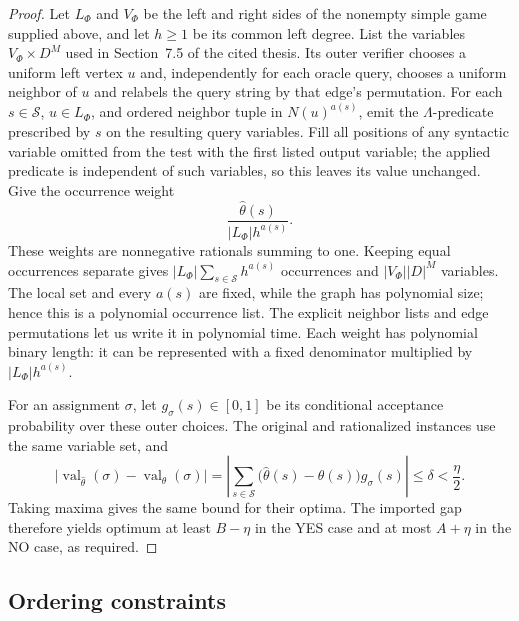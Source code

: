 \begin{proof}
Let \(L_\Phi\) and \(V_\Phi\) be the left and right sides of the
nonempty simple game supplied above, and let \(h\ge1\) be its common
left degree.
List the variables \(V_\Phi\times D^M\) used in Section~7.5 of the
cited thesis. Its outer verifier chooses a uniform left vertex \(u\)
and, independently for each
oracle query, chooses a uniform neighbor of \(u\) and relabels the
query string by that edge's permutation. For each \(s\in\mathcal S\),
\(u\in L_\Phi\), and ordered neighbor tuple in \(N(u)^{a(s)}\), emit
the \(\Lambda\)-predicate prescribed by \(s\) on the resulting query
variables. Fill all positions of any syntactic variable omitted from
the test with the first listed output variable; the applied predicate
is independent of such variables, so this leaves its value unchanged.
Give the occurrence
weight
\[
 \frac{\widehat\theta(s)}{|L_\Phi|h^{a(s)}}.
\]
These weights are nonnegative rationals summing to one. Keeping equal
occurrences separate gives
\(|L_\Phi|\sum_{s\in\mathcal S}h^{a(s)}\) occurrences and
\(|V_\Phi||D|^M\) variables. The local set and every \(a(s)\) are
fixed, while the graph has polynomial size; hence this is a polynomial
occurrence list. The explicit neighbor lists and edge permutations let
us write it in polynomial time. Each weight has polynomial binary
length: it can be represented with a fixed denominator multiplied by
\(|L_\Phi|h^{a(s)}\).

For an assignment \(\sigma\), let \(g_\sigma(s)\in[0,1]\) be its
conditional acceptance probability over these outer choices. The
original and rationalized instances use the same variable set, and
\[
 \bigl|\operatorname{val}_{\widehat\theta}(\sigma)
       -\operatorname{val}_{\theta}(\sigma)\bigr|
 =\left|\sum_{s\in\mathcal S}
       \bigl(\widehat\theta(s)-\theta(s)\bigr)g_\sigma(s)\right|
 \le\delta<\frac{\eta}{2}.
\]
Taking maxima gives the same bound for their optima. The imported gap
therefore yields optimum at least \(B-\eta\) in the YES case and at most
\(A+\eta\) in the NO case, as required.
\end{proof}

\subsection{Ordering constraints}

